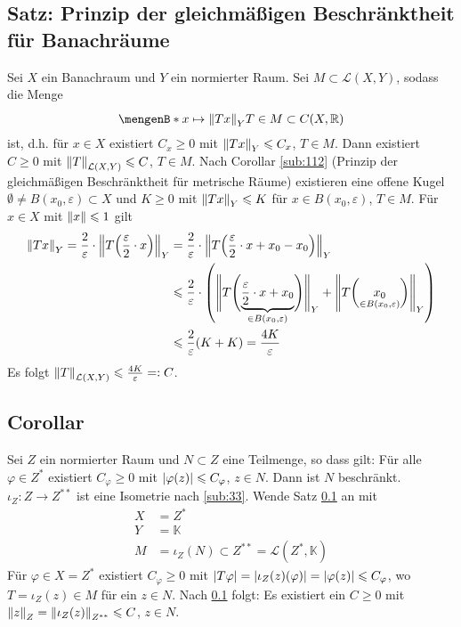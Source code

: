 \subsection{Satz: Prinzip der gleichmäßigen Beschränktheit für Banachräume} %
\label{sub:35}
Sei $X$ ein Banachraum und $Y$ ein normierter Raum. Sei $M \subset \mathcal{L}(X,Y)$, sodass die Menge 
\[
	\set[{x \mapsto \norm[Y]{T x}}]{T \in M \rule{0cm}{1em}} \subset C(X,\mathds{R} )
\]
 ist, d.h. für $x \in X$ existiert $C_x \ge 0$ mit $\norm[Y]{T x} \le C_x$, $T \in M$. Dann existiert $C \ge 0$ mit 
$\norm[\mathcal{L}(X,Y)]{T} \le C$, $T \in M$.
Nach Corollar \ref{sub:112} (Prinzip der gleichmäßigen Beschränktheit für metrische Räume) existieren eine offene Kugel $\emptyset \not= B(x_0,\varepsilon)\subset X$ und 
$K \ge 0$ mit $\norm[Y]{T x} \le K$ für $x \in B(x_0, \varepsilon)$, $T \in M$. Für $x \in X$ mit $\norm{x} \le 1$ gilt 
\begin{align*}
	\norm[Y]{T x} = \frac{2}{\varepsilon} \cdot  \norm[Y]{T \enbrace*{\frac{\varepsilon}{2} \cdot x}} &= \frac{2}{\varepsilon} \cdot 
	\norm[Y]{T \enbrace*{\frac{\varepsilon}{2} \cdot x + x_0 - x_0 } }  \\
	&\le \frac{2}{\varepsilon} \cdot   \enbrace*{ \doppelstrich[\Bigg]{T \enbrace[\Bigg]{\underbrace{\frac{\varepsilon}{2} \cdot x + x_0}_{\in B(x_0,\varepsilon)} } }_Y +
	 \norm[Y]{T  \enbrace[\bigg]{\underset{\in B(x_0,\varepsilon)}{x_0}} }} \\
	&\le \frac{2}{\varepsilon} (K+K) = \frac{4K}{\varepsilon}   
\end{align*}
Es folgt $\norm[\mathcal{L}(X,Y)]{T} \le \frac{4 K}{\varepsilon} =: C$. \bewende

\subsection[Corollar über Beschränktheit einer Teilmenge eines normierten Raumes]{Corollar} %
\label{sub:36}
Sei $Z$ ein normierter Raum und $N \subset Z$ eine Teilmenge, so dass gilt: Für alle $\varphi \in Z^*$ existiert $C_\varphi \ge 0$ mit $\abs*{\varphi(z)} \le C_\varphi$, 
$z \in N$.  Dann ist $N$ beschränkt.
$\iota_Z \colon Z \to Z^{**}$ ist eine Isometrie nach \ref{sub:33}. Wende Satz \ref{sub:35} an mit 
\begin{align*}
	X &=Z^{*} \\
	Y &=\mathds{K} \\
	M &= \iota_Z(N) \subset Z^{**}= \mathcal{L}(Z^*,\mathds{K})
\end{align*}
Für $\varphi \in X = Z^{*}$ existiert $C_\varphi \ge 0$ mit $\abs*{T \varphi} = \abs*{\iota_Z(z) (\varphi)} = \abs*{\varphi(z)} \le C_\varphi$, wo $T= \iota_Z(z) \in M$
für ein $z \in N$. Nach \ref{sub:35} folgt: Es existiert ein $C \ge 0$ mit $\norm[Z]{z} = \norm[Z^{**}]{\iota_Z(z)}  \le C$, $z \in N$. \bewende

